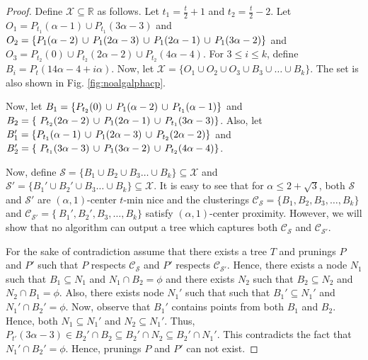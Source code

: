 \documentclass[anon,12pt]{colt2016} %
\newcommand{\mc}{\mathcal}
\begin{document}
\begin{proof}
Define $\mc X \subseteq \mathbb{R}$ as follows. Let $t_1 = \frac{t}{2}+1$ and $t_2 = \frac{t}{2}-2$. Let $O_1 = P_{t_1}(\alpha-1)\cup P_{t_1}(3\alpha-3)$ and $O_2 = \{P_{1}(\alpha-2) \thinspace\cup\thinspace P_{1}(2\alpha-3) \thinspace\cup\thinspace P_{1}(2\alpha-1) \thinspace\cup\thinspace P_{1}(3\alpha-2)\}$ and $O_3 = P_{t_2}(0)\cup P_{t_2}(2\alpha-2)\cup P_{t_2}(4\alpha-4)$. For $3\le i\le k$, define $B_i = P_t(14\alpha-4+i\alpha)$. Now, let $\mc X = \{O_1 \cup O_2 \cup O_3\cup B_3 \cup \ldots \cup B_k\}$. The set is also shown in Fig. \ref{fig:noalgalphacp}.

Now, let $B_1 = \{P_{t_2}(0) \thinspace\cup\thinspace  P_{1}(\alpha-2) \thinspace\cup\thinspace P_{t_1}(\alpha-1) \}$ and $B_2 = \{\ P_{t_2}(2\alpha-2) \thinspace\cup\thinspace P_{1}(2\alpha-1)\thinspace\cup\thinspace P_{t_1}(3\alpha-3)\}$. Also, let $B_1' = \{P_{t_1}(\alpha-1) \thinspace\cup\thinspace  P_{1}(2\alpha-3) \thinspace\cup\thinspace P_{t_2}(2\alpha-2) \}$ and $B_2' = \{\ P_{t_1}(3\alpha-3) \thinspace\cup\thinspace P_{1}(3\alpha-2)\thinspace\cup\thinspace P_{t_2}(4\alpha-4)\}$. 

Now, define $\mc S = \{B_1 \cup B_2 \cup B_3\ldots \cup B_k\} \subseteq \mc X$ and $\mc S' = \{B_1' \cup B_2' \cup B_3\ldots \cup B_k\} \subseteq \mc X$. It is easy to see that for $\alpha \le 2+\sqrt{3}$, both $\mc S$ and $\mc S'$ are $(\alpha, 1)$-center $t$-min nice and the clusterings $\mc C_{\mc S} = \{B_1, B_2, B_3, \ldots, B_k\}$ and $\mc C_{\mc S'} = \{\ B_1', B_2', B_3, \ldots, B_k\}$ satisfy $(\alpha, 1)$-center proximity. However, we will show that no algorithm can output a tree which captures both $\mc C_{\mc S}$ and $\mc C_{\mc S'}$.

For the sake of contradiction assume that there exists a tree $T$ and prunings $P$ and $P'$ such that $P$ respects $\mc C_{\mc S}$ and $P'$ respects $\mc C_{\mc S'}$. Hence, there exists a node $N_1$ such that $B_1 \subseteq N_1$ and $N_1 \cap B_2 = \phi$ and there exists $N_2$ such that $B_2 \subseteq N_2$ and $N_2 \cap B_1 = \phi$. Also, there exists node $N_1'$ such that such that $B_1' \subseteq N_1'$ and $N_1' \cap B_2' = \phi$. Now, observe that $B_1'$ contains points from both $B_1$ and $B_2$. Hence, both $N_1 \subseteq N_1'$ and $N_2 \subseteq N_1'$. Thus, $P_{t'}(3\alpha-3)\in B_2'\cap B_2 \subseteq B_2' \cap N_2 \subseteq B_2' \cap N_1'$. This contradicts the fact that $N_1' \cap B_2' = \phi$. Hence, prunings $P$ and $P'$ can not exist.
\end{proof}
\end{document}
